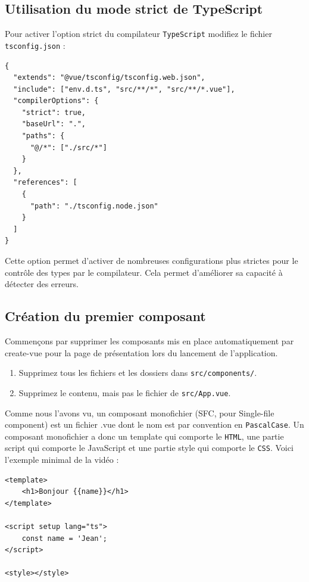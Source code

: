 \subsection{Utilisation du mode {\color{monOrange}strict} de {\color{monOrange}TypeScript}}
Pour activer l'option {\color{monOrange}strict} du compilateur {\tt TypeScript} modifiez le fichier {\tt tsconfig.json} :
\begin{verbatim}
{
  "extends": "@vue/tsconfig/tsconfig.web.json",
  "include": ["env.d.ts", "src/**/*", "src/**/*.vue"],
  "compilerOptions": {
    "strict": true,
    "baseUrl": ".",
    "paths": {
      "@/*": ["./src/*"]
    }
  },
  "references": [
    {
      "path": "./tsconfig.node.json"
    }
  ]
}
\end{verbatim} 

Cette option permet d'activer de nombreuses configurations plus strictes pour le contrôle des types par le compilateur. Cela permet d'améliorer sa capacité à détecter des erreurs.

\subsection{Création du premier composant}
Commençons par supprimer les composants mis en place automatiquement par {\color{monOrange}create-vue} pour la page de présentation lors du lancement de l'application. 
\begin{enumerate}
\item Supprimez tous les fichiers et les dossiers dans {\tt src/components/}.
\item Supprimez le contenu, mais pas le fichier de {\tt src/App.vue}.
\end{enumerate}

Comme nous l'avons vu, un composant {\color{blue} monofichier} (SFC, pour Single-file component) est un fichier {\color{blue} .vue} dont le nom est par convention en {\tt PascalCase}. Un composant monofichier a donc un template qui comporte le {\tt HTML}, une partie script qui comporte le JavaScript et une partie style qui comporte le {\tt CSS}. Voici l'exemple minimal de la vidéo :
\begin{verbatim}
<template>
    <h1>Bonjour {{name}}</h1>
</template>

<script setup lang="ts">
    const name = 'Jean';
</script>

<style></style>
\end{verbatim} 

